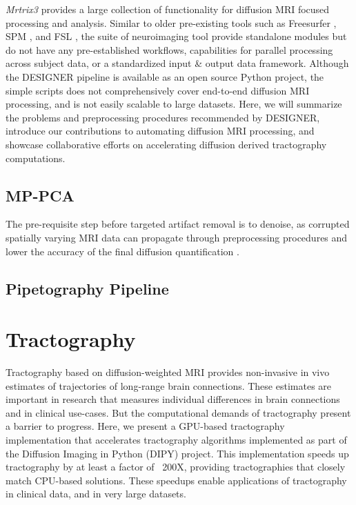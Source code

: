 \emph{Mrtrix3} provides a large collection of functionality for diffusion MRI focused processing and analysis. Similar to older pre-existing tools such as Freesurfer \cite{Fischl2012}, SPM \cite{penny_statistical_2006}, and FSL \cite{Jenkinson2012}, the suite of neuroimaging tool provide standalone modules but do not have any pre-established workflows, capabilities for parallel processing across subject data, or a standardized input \& output data framework. Although the DESIGNER pipeline is available as an open source Python project, the simple scripts does not comprehensively cover end-to-end diffusion MRI processing, and is not easily scalable to large datasets. Here, we will summarize the problems and preprocessing procedures recommended by DESIGNER, introduce our contributions to automating diffusion MRI processing, and showcase collaborative efforts on accelerating diffusion derived tractography computations.

\subsection{MP-PCA}
The pre-requisite step before targeted artifact removal is to denoise, as corrupted spatially varying MRI data can propagate through preprocessing procedures and lower the accuracy of the final diffusion quantification \cite{vizioli_lowering_2021}. 

\subsection{Pipetography Pipeline}

\section{Tractography}
Tractography based on diffusion-weighted MRI provides non-invasive in vivo estimates of trajectories of long-range brain connections. These estimates are important in research that measures individual differences in brain connections and in clinical use-cases. But the computational demands of tractography present a barrier to progress. Here, we present a GPU-based tractography implementation that accelerates tractography algorithms implemented as part of the Diffusion Imaging in Python (DIPY) project. This implementation speeds up tractography by at least a factor of ~200X, providing tractographies that closely match CPU-based solutions. These speedups enable applications of tractography in clinical data, and in very large datasets.

